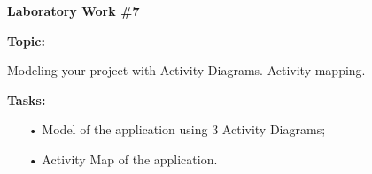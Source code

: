 \graphicspath{ {pic/} }
\begin{flushleft}
\setlength{\parindent}{2ex}\par
\textbf{Laboratory Work \#7} \par
\textbf{Topic:}\par
Modeling your project with Activity Diagrams. Activity mapping.
\par
\textbf{Tasks:}
\begin{enumerate}
\item[•] Model of the application using 3 Activity Diagrams;
\item[•] Activity Map of the application.
\end{enumerate}
\end{flushleft}
\clearpage

